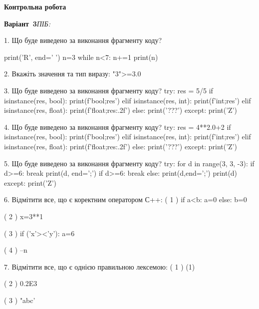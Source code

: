 \documentclass[11pt]{article}
\begin{document}
{\large\textbf{Контрольна робота}}

\textbf{Варіант \No\,3}\hfill \textit{ПІБ:}\,\underline{\hspace{60mm}}
\vspace{4mm}

1. Що буде виведено за виконання фрагменту коду?

print('R', end=' ')
n=3
while n<7:
    n+=1
print(n)

\vspace{5mm}

2. 
Вкажіть значення та тип виразу:
"3">=3.0
\vspace{5mm}

3. Що буде виведено за виконання фрагменту коду?
try:
    res = 5/5%
    if isinstance(res, bool):
        print(f'bool;{res}')
    elif isinstance(res, int):
        print(f'int;{res}')
    elif isinstance(res, float):
        print(f'float;{res:.2f}')
    else:
        print('???')
except:
    print('Z')
\vspace{5mm}

4. Що буде виведено за виконання фрагменту коду?
try:
    res = 4**2.0+2
    if isinstance(res, bool):
        print(f'bool;{res}')
    elif isinstance(res, int):
        print(f'int;{res}')
    elif isinstance(res, float):
        print(f'float;{res:.2f}')
    else:
        print('???')
except:
    print('Z')
\vspace{5mm}

5. Що буде виведено за виконання фрагменту коду?
try:
    for d in range(3, 3, -3):
        if d>=6:
            break
        print(d, end=';')
        if d>=6:
            break
    else:
        print(d,end=';')
    print(d)
except:
    print('Z')
\vspace{5mm}

6. %
Відмітити все, що є коректним оператором С++:
( 1 ) if a<b: a=0 else: b=0

( 2 ) x=3**1

( 3 ) if ('x'><'y'): a=6

( 4 ) --n
\vspace{5mm}

7. %
Відмітити все, що є однією правильною лексемою:
( 1 ) (1)

( 2 ) 0.2E3

( 3 ) "abc'
\end{document}

